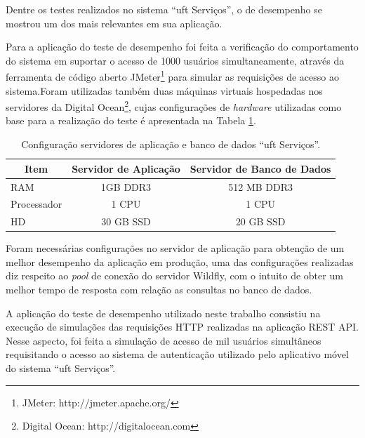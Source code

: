 \noindent Dentre os testes realizados no sistema ``\acrshort{uft} Serviços'', o de desempenho se mostrou um dos mais relevantes em sua aplicação. 

Para a aplicação do teste de desempenho foi feita a verificação do comportamento do sistema em suportar o acesso de 1000 usuários simultaneamente, através da ferramenta de código aberto JMeter\footnote{JMeter: http://jmeter.apache.org/} para simular as requisições de acesso ao sistema.Foram utilizadas também duas máquinas virtuais hospedadas nos servidores da Digital Ocean\footnote{Digital Ocean: http://digitalocean.com}, cujas configurações de \textit{hardware} utilizadas como base para a realização do teste é apresentada na Tabela \ref{tbl_config_desempenho}.

\begin{table}[!h]
\centering
\begin{tabular}{|l|c|c|}
\hline
\multicolumn{1}{|c|}{Item} & \multicolumn{1}{l|}{Servidor de Aplicação} & \multicolumn{1}{l|}{Servidor de Banco de Dados} \\ \hline
RAM                        & 1GB DDR3                                   & 512 MB DDR3                                     \\ \hline
Processador                & 1 CPU                                      & 1 CPU                                           \\ \hline
HD                         & 30 GB SSD                                  & 20 GB SSD                                       \\ \hline
\end{tabular}
\caption{Configuração servidores de aplicação e banco de dados ``\acrshort{uft} Serviços''.}
\label{tbl_config_desempenho}
\end{table}

Foram necessárias configurações no servidor de aplicação para obtenção de um melhor desempenho da aplicação em produção, uma das configurações realizadas diz respeito ao \textit{pool} de conexão do servidor Wildfly, com o intuito de obter um melhor tempo de resposta com relação as consultas no banco de dados.

A aplicação do teste de desempenho utilizado neste trabalho consistiu na execução de simulações das requisições HTTP realizadas na aplicação REST API. Nesse aspecto, foi feita a simulação de acesso de mil usuários simultâneos requisitando o acesso ao sistema de autenticação utilizado pelo aplicativo móvel do sistema ``\acrshort{uft} Serviços''.

